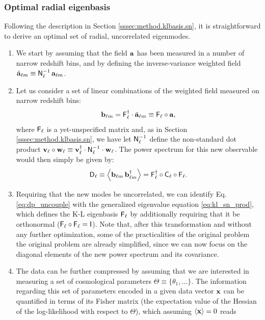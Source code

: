 \documentclass[twocolumn,amsfont,amssymb,amsmath, showpacs,balancelastpage, nofootinbib]{revtex4-1}
\begin{document}
    \subsubsection{Optimal radial eigenbasis}\label{sssec:method.tomographic.kl}
      Following the description in Section \ref{sssec:method.klbasis.sn}, it is straightforward to derive an optimal set of radial, uncorrelated eigenmodes.
      \begin{enumerate}
        \item We start by assuming that the field ${\bf a}$ has been measured in a number of narrow redshift bins, and by defining the inverse-variance weighted field $\tilde{\bf a}_{\ell m}\equiv{\sf N}^{-1}_\ell\,{\bf a}_{\ell m}$.
        \item Let us consider a set of linear combinations of the weighted field measured on narrow redshift bins:
        \begin{equation}
          {\bf b}_{\ell m}={\sf F}_\ell^\dag\cdot\tilde{\bf a}_{\ell m}\equiv{\sf F}_\ell\circ{\bf a},
        \end{equation}
        where ${\sf F}_\ell$ is a yet-unspecified matrix and, as in Section \ref{sssec:method.klbasis.sn}, we have let ${\sf N}^{-1}_\ell$ define the non-standard dot product ${\bf v}_\ell\circ{\bf w}_\ell\equiv{\bf v}^\dag_\ell\cdot{\sf N}^{-1}_\ell\cdot{\bf w}_\ell$. The power spectrum for this new observable would then simply be given by:
        \begin{equation}\label{eq:dp_uncouple}
          {\sf D}_\ell\equiv\left\langle{\bf b}_{\ell m}\,{\bf b}^\dag_{\ell m}\right\rangle={\sf F}_\ell^\dag\circ{\sf C}_\ell\circ{\sf F}_\ell.
        \end{equation}
        \item Requiring that the new modes be uncorrelated, we can identify Eq. \ref{eq:dp_uncouple} with the generalized eigenvalue equation \ref{eq:kl_sn_prod}, which defines the K-L eigenbasis ${\sf F}_\ell$ by additionally requiring that it be orthonormal (${\sf F}_\ell\circ{\sf F}_\ell={\sf I}$). Note that, after this transformation and without any further optimization, some of the practicalities of the original problem the original problem are already simplified, since we can now focus on the diagonal elements of the new power spectrum and its covariance.
        \item The data can be further compressed by assuming that we are interested in measuring a set of cosmological parameters $\Theta\equiv\{\theta_1,...\}$. The information regarding this set of parameters encoded in a given data vector ${\bf x}$ can be quantified in terms of its Fisher matrix (the expectation value of the Hessian of the log-likelihood with respect to $\Theta$), which assuming $\langle{\bf x}\rangle=0$ reads

\end{enumerate}
\end{document}
